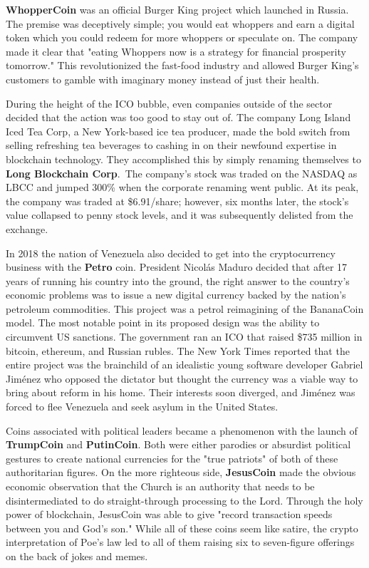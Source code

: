 
\textbf{WhopperCoin} was an official Burger King project which launched in
Russia. The premise was deceptively simple; you would eat whoppers and earn a
digital token which you could redeem for more whoppers or speculate on. The
company made it clear that "eating Whoppers now is a strategy for financial
prosperity tomorrow." This revolutionized the fast-food industry and allowed
Burger King's customers to gamble with imaginary money instead of just their
health.

During the height of the ICO bubble, even companies outside of the sector
decided that the action was too good to stay out of. The company Long Island
Iced Tea Corp, a New York-based ice tea producer, made the bold switch from
selling refreshing tea beverages to cashing in on their newfound expertise in
blockchain technology. They accomplished this by simply renaming themselves to
\textbf{Long Blockchain Corp}. The company's stock was traded on the NASDAQ as LBCC
and jumped 300\% when the corporate renaming went public. At its peak, the
company was traded at \$6.91/share; however, six months later, the stock's value
collapsed to penny stock levels, and it was subsequently delisted from the
exchange.


In 2018 the nation of Venezuela also decided to get into the cryptocurrency
business with the \textbf{Petro} coin. President Nicolás Maduro decided that
after 17 years of running his country into the ground, the right answer to the
country's economic problems was to issue a new digital currency backed by the
nation's petroleum commodities. This project was a petrol reimagining of the
BananaCoin model. The most notable point in its proposed design was the ability
to circumvent US sanctions. The government ran an ICO that raised \$735 million
in bitcoin, ethereum, and Russian rubles. The New York Times reported that the
entire project was the brainchild of an idealistic young software developer
Gabriel Jiménez who opposed the dictator but thought the currency was a viable
way to bring about reform in his home. Their interests soon diverged, and
Jiménez was forced to flee Venezuela and seek asylum in the United States.
\cite{popper_coder_2020}



Coins associated with political leaders became a phenomenon with the launch of
\textbf{TrumpCoin} and \textbf{PutinCoin}. Both were either parodies or
absurdist political gestures to create national currencies for the "true
patriots" of both of these authoritarian figures. On the more righteous side,
\textbf{JesusCoin} made the obvious economic observation that the Church is an
authority that needs to be disintermediated to do straight-through processing to
the Lord. Through the holy power of blockchain, JesusCoin was able to give
"record transaction speeds between you and God's son." While all of these coins
seem like satire, the crypto interpretation of Poe's law led to all of them
raising six to seven-figure offerings on the back of jokes and memes.


